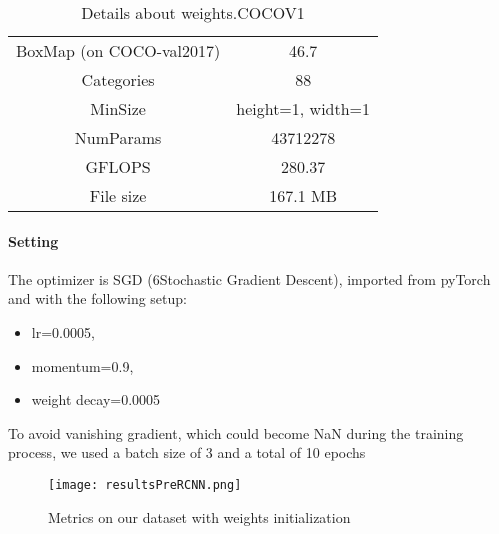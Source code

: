 \begin{table}[h!]
    \centering
    \begin{tabular}{c|c}
    BoxMap (on COCO-val2017) & 46.7 \\
    Categories & 88 \\
    MinSize & height=1, width=1\\
    NumParams & 43712278\\
    GFLOPS & 280.37\\
    File size & 167.1 MB

    \end{tabular}
    \caption{Details about weights.COCOV1}
    \label{tab:weights}
\end{table}

\paragraph{Setting}
The optimizer is SGD (6Stochastic Gradient Descent), imported from pyTorch and with the following setup:
\begin{itemize}
    \item lr=0.0005,
    \item momentum=0.9,
    \item weight decay=0.0005
\end{itemize}

To avoid vanishing gradient, which could become NaN during the training process, we used a batch size of 3 and a total of 10 epochs

\begin{figure}[h!]
  \centering
  \texttt{[image: resultsPreRCNN.png]}
  \caption{Metrics on our dataset with weights initialization}
  \label{fig:resultsprercnn}
\end{figure}

